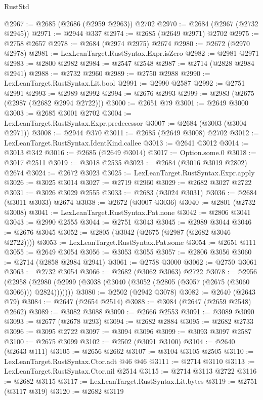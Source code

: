 \begin{lexlean}{RustStd}
\begin{coremodule}
@2967 := @2685 (@2686 (@2959 @2963)) @2702
@2970 := @2684 (@2967 (@2732 @2945))
@2971 := @2944 @337
@2974 := @2685 (@2649 @2971) @2702
@2975 := @2758 @2657
@2978 := @2684 (@2974 @2975) @2674
@2980 := @2672 (@2970 @2978)
@2981 := LexLeanTarget.RustSyntax.Expr.isZero
@2982 := @2981 @2971
@2983 := @2800 @2982
@2984 := @2547 @2548
@2987 := @2714 (@2828 @2984 @2941)
@2988 := @2732 @2960
@2989 := @2750 @2988
@2990 := LexLeanTarget.RustSyntax.Lit.bool
@2991 := @2990 @2587
@2992 := @2751 @2991
@2993 := @2989 @2992
@2994 := @2676 @2993
@2999 := @2983 (@2675 (@2987 (@2682 @2994 @2722)))
@3000 := @2651 @79
@3001 := @2649 @3000
@3003 := @2685 @3001 @2702
@3004 := LexLeanTarget.RustSyntax.Expr.predecessor
@3007 := @2684 (@3003 (@3004 @2971))
@3008 := @2944 @370
@3011 := @2685 (@2649 @3008) @2702
@3012 := LexLeanTarget.RustSyntax.IdentKind.callee
@3013 := @2641 @3012
@3014 := @3013 @342
@3016 := @2685 (@2649 @3014)
@3017 := Option.some.{0}
@3018 := @3017 @2511
@3019 := @3018 @2535
@3023 := @2684 (@3016 @3019 @2802) @2674
@3024 := @2672 @3023
@3025 := LexLeanTarget.RustSyntax.Expr.apply
@3026 := @3025 @3014
@3027 := @2719 @2960
@3029 := @2682 @3027 @2722
@3031 := @3026 @3029 @2555
@3033 := @2683 (@3024 @3031)
@3036 := @2684 (@3011 @3033) @2674
@3038 := @2672 (@3007 @3036)
@3040 := @2801 (@2732 @3008)
@3041 := LexLeanTarget.RustSyntax.Pat.none
@3042 := @2806 @3041
@3043 := @2990 @2555
@3044 := @2751 @3043
@3045 := @2989 @3044
@3046 := @2676 @3045
@3052 := @2805 (@3042 (@2675 (@2987 (@2682 @3046 @2722))))
@3053 := LexLeanTarget.RustSyntax.Pat.some
@3054 := @2651 @111
@3055 := @2649 @3054
@3056 := @3053 @3055
@3057 := @2806 @3056
@3060 := @2714 (@2858 @2984 @2941)
@3061 := @2758 @3000
@3062 := @2750 @3061
@3063 := @2732 @3054
@3066 := @2682 (@3062 @3063) @2722
@3078 := @2956
    (@2958 (@2980 (@2999 (@3038 (@3040 (@3052 (@2805 (@3057 (@2675 (@3060 @3066))) @2824)))))))
@3080 := @2502 (@2942 @3078)
@3082 := @2640 (@2643 @79)
@3084 := @2647 (@2654 @2514)
@3088 := @3084 (@2647 (@2659 @2548) @2662)
@3089 := @3082 @3088
@3090 := @2666 @2553
@3091 := @3089 @3090
@3093 := @2677 (@2678 @293)
@3094 := @2682 @2884
@3095 := @2682 @2733
@3096 := @3095 @2722
@3097 := @3094 @3096
@3099 := @3093 @3097 @2587
@3100 := @2675 @3099
@3102 := @2502 (@3091 @3100)
@3104 := @2640 (@2643 @111)
@3105 := @2656 @2662
@3107 := @3104 @3105 @2505
@3110 := LexLeanTarget.RustSyntax.Ctor.adt @46 @46
@3111 := @2714 @3110
@3113 := LexLeanTarget.RustSyntax.Ctor.nil @2514
@3115 := @2714 @3113 @2722
@3116 := @2682 @3115
@3117 := LexLeanTarget.RustSyntax.Lit.bytes
@3119 := @2751 (@3117 @319)
@3120 := @2682 @3119

\end{coremodule}
\end{lexlean}
